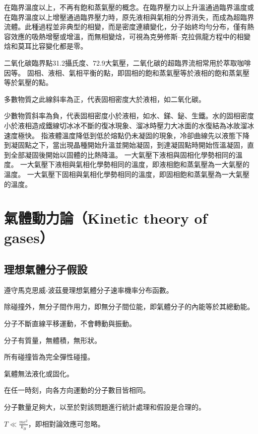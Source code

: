 \documentclass[a4paper,12pt]{report}
\begin{document}
在臨界溫度以上，不再有飽和蒸氣壓的概念。在臨界壓力以上升溫通過臨界溫度或在臨界溫度以上增壓通過臨界壓力時，原先液相與氣相的分界消失，而成為超臨界流體。此種過程並非典型的相變，而是密度連續變化，分子始終均勻分布，僅有熱容效應的吸熱增壓或增溫，而無相變焓，可視為克勞修斯–克拉佩龍方程中的相變焓和莫耳比容變化都是零。

二氧化碳臨界點31.2攝氏度、72.9大氣壓，二氧化碳的超臨界流相常用於萃取咖啡因等。
固相、液相、氣相平衡的點，即固相的飽和蒸氣壓等於液相的飽和蒸氣壓等於氣壓的點。
\bit
\item 多數物質之此線斜率為正，代表固相密度大於液相，如二氧化碳。
\item 少數物質斜率為負，代表固相密度小於液相，如水、銻、鉍、生鐵。水的固相密度小於液相造成鐵線切冰冰不斷的復冰現象、溜冰時壓力大冰面的水復結為冰故溜冰速度極快。
\eit
{}
指液體溫度降低到低於熔點仍未凝固的現象，冷卻曲線先以液態下降到凝固點之下，當出現晶種開始升溫並開始凝固，到達凝固點時開始恆溫凝固，直到全部凝固後開始以固體的比熱降溫。
一大氣壓下液相與固相化學勢相同的溫度。
一大氣壓下液相與氣相化學勢相同的溫度，即液相飽和蒸氣壓為一大氣壓的溫度。
一大氣壓下固相與氣相化學勢相同的溫度，即固相飽和蒸氣壓為一大氣壓的溫度。


\section{氣體動力論（Kinetic theory of gases）}
\subsection{理想氣體分子假設}
\bit
\item 遵守馬克思威-波茲曼理想氣體分子速率機率分布函數。
\item 除碰撞外，無分子間作用力，即無分子間位能，即氣體分子的內能等於其總動能。
\item 分子不斷直線平移運動，不會轉動與振動。
\item 分子有質量，無體積，無形狀。
\item 所有碰撞皆為完全彈性碰撞。
\item 氣體無法液化或固化。
\item 在任一時刻，向各方向運動的分子數目皆相同。
\item 分子數量足夠大，以至於對該問題進行統計處理和假設是合理的。
\item $T \ll \frac{mc^2}{k_B}$，即相對論效應可忽略。
\eit
\end{document}
